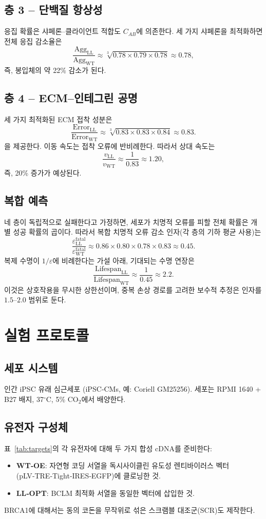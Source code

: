 \documentclass[12pt,a4paper]{article}
\begin{document}
	\subsection{층 3 – 단백질 항상성}
	응집 확률은 샤페론–클라이언트 적합도 \(C_{AB}\)에 의존한다. 세 가지 샤페론을 최적화하면 전체 응집 감소율은
	\[
	\frac{\mathrm{Agg}_{\mathrm{LL}}}{\mathrm{Agg}_{\mathrm{WT}}} \approx \sqrt[3]{0.78 \times 0.79 \times 0.78} \approx 0.78,
	\]
	즉, 봉입체의 약 22\% 감소가 된다.
	
	\subsection{층 4 – ECM–인테그린 공명}
	세 가지 최적화된 ECM 접착 성분은
	\[
	\frac{\mathrm{Error}_{\mathrm{LL}}}{\mathrm{Error}_{\mathrm{WT}}} \approx \sqrt[3]{0.83 \times 0.83 \times 0.84} \approx 0.83.
	\]
	을 제공한다. 이동 속도는 접착 오류에 반비례한다. 따라서 상대 속도는
	\[
	\frac{v_{\mathrm{LL}}}{v_{\mathrm{WT}}} \approx \frac{1}{0.83} \approx 1.20,
	\]
	즉, 20\% 증가가 예상된다.
	
	\subsection{복합 예측}
	네 층이 독립적으로 실패한다고 가정하면, 세포가 치명적 오류를 피할 전체 확률은 개별 성공 확률의 곱이다. 따라서 복합 치명적 오류 감소 인자(각 층의 기하 평균 사용)는
	\[
	\frac{\varepsilon_{\mathrm{LL}}^{\mathrm{fatal}}}{\varepsilon_{\mathrm{WT}}^{\mathrm{fatal}}} \approx 0.86 \times 0.80 \times 0.78 \times 0.83 \approx 0.45.
	\]
	복제 수명이 \(1/\varepsilon\)에 비례한다는 가설 아래, 기대되는 수명 연장은
	\[
	\frac{\mathrm{Lifespan}_{\mathrm{LL}}}{\mathrm{Lifespan}_{\mathrm{WT}}} \approx \frac{1}{0.45} \approx 2.2.
	\]
	이것은 상호작용을 무시한 상한선이며, 중복 손상 경로를 고려한 보수적 추정은 인자를 \(1.5\)–\(2.0\) 범위로 둔다.
	
	\section{실험 프로토콜}
	\label{sec:protocol}
	
	\subsection{세포 시스템}
	인간 iPSC 유래 심근세포 (iPSC‑CMs, 예: Coriell GM25256). 세포는 RPMI 1640 + B27 배지, 37\(^\circ\)C, 5\% CO\(_2\)에서 배양한다.
	
	\subsection{유전자 구성체}
	표~\ref{tab:targets}의 각 유전자에 대해 두 가지 합성 cDNA를 준비한다:
	\begin{itemize}
		\item \textbf{WT‑OE}: 자연형 코딩 서열을 독시사이클린 유도성 렌티바이러스 벡터(pLV‑TRE‑Tight‑IRES‑EGFP)에 클로닝한 것.
		\item \textbf{LL‑OPT}: BCLM 최적화 서열을 동일한 벡터에 삽입한 것.
	\end{itemize}
	BRCA1에 대해서는 동의 코돈을 무작위로 섞은 스크램블 대조군(SCR)도 제작한다.
	
\end{document}
